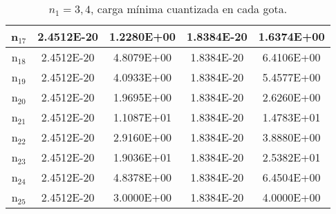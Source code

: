 \documentclass{article}
\begin{document}
\begin{enumerate}
\begin{table}[h!]
\begin{tabular}{|c|c|c|c|c|}
       \hline       
       n$_{17}$  & 2.4512E-20 & 1.2280E+00 & 1.8384E-20 & 1.6374E+00\\
       \hline       
       n$_{18}$  & 2.4512E-20 & 4.8079E+00 & 1.8384E-20 & 6.4106E+00\\
       \hline       
       n$_{19}$  & 2.4512E-20 & 4.0933E+00 & 1.8384E-20 & 5.4577E+00\\
       \hline       
       n$_{20}$  & 2.4512E-20 & 1.9695E+00 & 1.8384E-20 & 2.6260E+00\\
       \hline       
       n$_{21}$  & 2.4512E-20 & 1.1087E+01 & 1.8384E-20 & 1.4783E+01\\
       \hline       
       n$_{22}$  & 2.4512E-20 & 2.9160E+00 & 1.8384E-20 & 3.8880E+00\\
       \hline       
       n$_{23}$  & 2.4512E-20 & 1.9036E+01 & 1.8384E-20 & 2.5382E+01\\
       \hline       
       n$_{24}$  & 2.4512E-20 & 4.8378E+00 & 1.8384E-20 & 6.4504E+00\\
       \hline       
       n$_{25}$  & 2.4512E-20 & 3.0000E+00 & 1.8384E-20 & 4.0000E+00\\
       \hline

    \end{tabular}
    \caption{$n_{1}=3,4$, carga mínima cuantizada en cada gota.}
    \label{tab:my_label}
\end{table}




\end{enumerate}
\end{document}
